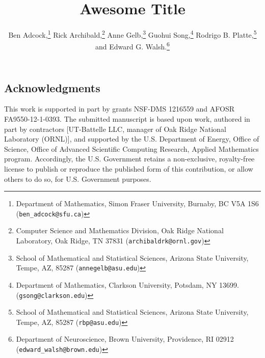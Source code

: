 \documentclass[journal]{IEEEtran}
\begin{document}
\title{Awesome Title}

\author{Ben Adcock,\thanks{Department of Mathematics, Simon Fraser University, Burnaby, BC V5A 1S6 ({\tt ben\_adcock@sfu.ca})} 
	Rick Archibald,\thanks{Computer Science and Mathematics Division, Oak Ridge National Laboratory, Oak Ridge, TN 37831 ({\tt archibaldrk@ornl.gov})} 
        Anne Gelb,\thanks{School of Mathematical and Statistical Sciences, Arizona State University, Tempe, AZ, 85287 ({\tt annegelb@asu.edu})}
        Guohui Song,\thanks{Department of Mathematics, Clarkson University, Potsdam, NY 13699. ({\tt gsong@clarkson.edu})} 
        Rodrigo B. Platte,\thanks{School of Mathematical and Statistical Sciences, Arizona State University, Tempe, AZ, 85287 ({\tt rbp@asu.edu})} and
        Edward G. Walsh.\thanks{Department of Neuroscience, Brown University, Providence, RI 02912 ({\tt edward\_walsh@brown.edu})}}



\newtheorem{thm4}{Theorem}
\newtheorem{thm5}{Theorem}
\newtheorem{thm}{Theorem}
\newtheorem{defn}[thm5]{Definition}
\newtheorem{algorithm}{Algorithm}

\maketitle










\subsection*{Acknowledgments}
\label{sect:acks}
This work is supported in part by grants NSF-DMS 1216559 and AFOSR FA9550-12-1-0393.   The submitted manuscript is based upon work, authored in part by contractors [UT-Battelle LLC, manager of Oak Ridge National Laboratory (ORNL)], and supported by the U.S. Department of Energy, Office of Science, Office of Advanced Scientific Computing Research, Applied Mathematics program. Accordingly, the U.S. Government retains a non-exclusive,  royalty-free license to publish or reproduce the published form of this contribution, or allow others to do so, for U.S. Government purposes.



\end{document}

